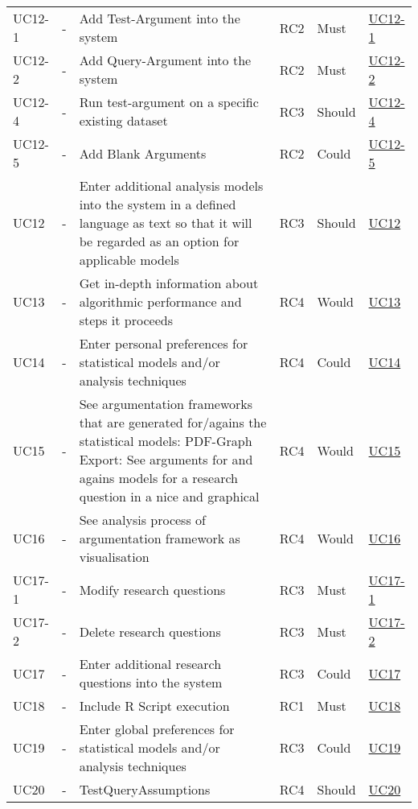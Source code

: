 \begin{landscape}
\begin{longtable}{l l p{8cm} l l l}
UC12-1 	& - & 	Add Test-Argument into the system & RC2 & Must & \href{https://trello.com/c/2V6Cl65u}{UC12-1}\\
UC12-2 	& - & 	Add Query-Argument into the system & RC2 & Must & \href{https://trello.com/c/OwM2Z7wt}{UC12-2}\\
UC12-4 	& - & 	 Run test-argument on a specific existing dataset & RC3	& Should & \href{https://trello.com/c/CkpJUNPW}{UC12-4}\\
UC12-5 	& - & 	Add Blank Arguments & RC2 & Could & \href{https://trello.com/c/Rg6GPnNE}{UC12-5}\\
UC12 	& - & 	Enter additional analysis models into the system in a defined language as text so that it will be regarded as an option for applicable models	& RC3 & Should &	\href{https://trello.com/c/5UMo7o6U}{UC12}\\
UC13 	& - & 	Get in-depth information about algorithmic performance and steps it proceeds & RC4 & Would & \href{https://trello.com/c/ORlMByiQ}{UC13}\\
UC14 	& - & 	Enter personal preferences for statistical models and/or analysis techniques & RC4 & Could & \href{https://trello.com/c/NcV3lo4w}{UC14}\\
UC15 	& - & 	See argumentation frameworks that are generated for/agains the statistical models: PDF-Graph Export: See arguments for and agains models for a research question in a nice and graphical &RC4 & Would & 	\href{https://trello.com/c/BOUu2hKN}{UC15}\\
UC16 	& - & 	See analysis process of argumentation framework as visualisation & RC4 & Would	& \href{https://trello.com/c/3FCcFdmm}{UC16}\\
UC17-1 	& - & 	Modify research questions&RC3 & Must & 	\href{https://trello.com/c/w1YiIgU7}{UC17-1}\\
UC17-2 	& - & 	Delete research questions&RC3&Must&\href{https://trello.com/c/UbT5mtDx}{UC17-2}\\
UC17 	& - & 	Enter additional research questions into the system & RC3 &Could&\href{https://trello.com/c/Hv2xe2UW}{UC17}\\
UC18 	& - & 	Include R Script execution	 & RC1 & Must & \href{https://trello.com/c/dpLHOxbB}{UC18}\\
UC19 	& - & 	Enter global preferences for statistical models and/or analysis techniques& RC3 & Could &	\href{https://trello.com/c/bZHdWpkt}{UC19}\\
UC20 	& - & 	TestQueryAssumptions & RC4 & Should & \href{https://trello.com/c/VThxB5aS}{UC20}\\

\end{longtable}
\end{landscape}

